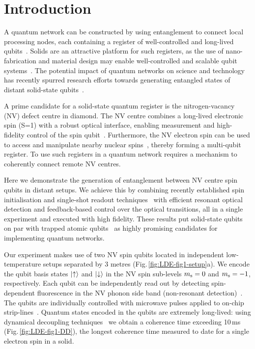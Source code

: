 \clearpage

\section{Introduction}

A quantum network can be constructed by using entanglement to connect local processing nodes, each containing a register of well-controlled and long-lived qubits~\cite{Kimble2008}. Solids are an attractive platform for such registers, as the use of nano-fabrication and material design may enable well-controlled and scalable qubit systems~\cite{Ladd2010}. The potential impact of quantum networks on science and technology has recently spurred research efforts towards generating entangled states of distant solid-state qubits~\cite{Togan2010,Gao2012,DeGreve2012,Bernien2012a,Sipahigil2012,Patel2010,Flagg2010}.

A prime candidate for a solid-state quantum register is the nitrogen-vacancy (NV) defect centre in diamond. The NV centre combines a long-lived electronic spin (S=1) with a robust optical interface, enabling measurement and high-fidelity control of the spin qubit~\cite{Togan2010,Fuchs2009,DeLange2010,VanderSar2012}. Furthermore, the NV electron spin can be used to access and manipulate nearby nuclear spins~\cite{Robledo2011,Neumann2010a,Neumann2008,Maurer2012,Pfaff2012}, thereby forming a multi-qubit register. To use such registers in a quantum network requires a mechanism to coherently connect remote NV centres.

Here we demonstrate the generation of entanglement between NV centre spin qubits in distant setups. We achieve this by combining recently established spin initialisation and single-shot readout techniques~\cite{Robledo2011} with efficient resonant optical detection and feedback-based control over the optical transitions, all in a single experiment and executed with high fidelity. These results put solid-state qubits on par with trapped atomic qubits~\cite{Moehring2007,Ritter2012,Hofmann2012} as highly promising candidates for implementing quantum networks.

Our experiment makes use of two NV spin qubits located in independent low-temperature setups separated by 3 metres (Fig.\,\ref{fig:LDE-fig1-setup}a). We encode the qubit basis states $\left|\uparrow\right\rangle$ and $\left|\downarrow\right\rangle$ in the NV spin sub-levels $m_\mathrm s = 0$ and $m_\mathrm s = -1$, respectively. Each qubit can be independently read out by detecting spin-dependent fluorescence in the NV phonon side band (non-resonant detection)~\cite{Robledo2011}. The qubits are individually controlled with microwave pulses applied to on-chip strip-lines~\cite{DeLange2010}. Quantum states encoded in the qubits are extremely long-lived: using dynamical decoupling techniques~\cite{DeLange2010} we obtain a coherence time exceeding 10$\,$ms (Fig.\,\ref{fig:LDE-fig1-DD}), the longest coherence time measured to date for a single electron spin in a solid.

